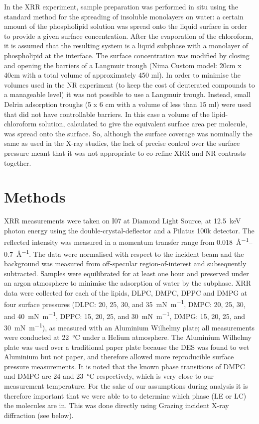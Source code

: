 \documentclass[11pt,a4paper]{paper}
\begin{document}
In the XRR experiment, sample preparation was performed in situ using the standard method for the spreading of insoluble monolayers on water: a certain amount of the phospholipid solution was spread onto the liquid surface in order to provide a given surface concentration. After the evaporation of the chloroform, it is assumed that the resulting system is a liquid subphase with a monolayer of phospholipid at the interface. The surface concentration was modified by closing and opening the barriers of a Langmuir trough (Nima Custom model: 20cm x 40cm with a total volume of approximately 450 ml). In order to minimise the volumes used in the NR experiment (to keep the cost of deuterated compounds to a manageable level) it was not possible to use a Langmuir trough. Instead, small Delrin adsorption troughs (5 x 6 cm with a volume of less than 15 ml) were used that did not have controllable barriers. In this case a volume of the lipid-chloroform solution, calculated to give the equivalent surface area per molecule, was spread onto the surface. So, although the surface coverage was nominally the same as used in the X-ray studies, the lack of precise control over the surface pressure meant that it was not appropriate to co-refine XRR and NR contrasts together.

\section{Methods}
XRR measurements were taken on I07 at Diamond Light Source, at \SI{12.5}{\kilo\eV} photon energy using the double-crystal-deflector\cite{Arnold2012} and a Pilatus 100k detector. The reflected intensity was measured in a momentum transfer range from \SIrange{0.018}{0.7}{\AA^{-1}}. The data were normalised with respect to the incident beam and the background was measured from off-specular region-of-interest and subsequently subtracted. Samples were equilibrated for at least one hour and preserved under an argon atmosphere to minimise the adsorption of water by the subphase. XRR data were collected for each of the lipids, DLPC, DMPC, DPPC and DMPG at four surface pressures (DLPC: 20, 25, 30, and \SI{35}{\milli\newton\meter^{-1}}, DMPC: 20, 25, 30, and \SI{40}{\milli\newton\meter^{-1}}, DPPC: 15, 20, 25, and \SI{30}{\milli\newton\meter^{-1}}, DMPG: 15, 20, 25, and \SI{30}{\milli\newton\meter^{-1}}), as measured with an Aluminium Wilhelmy plate; all measurements were conducted at \SI{22}{\celsius} under a Helium atmosphere. The Aluminium Wilhelmy plate was used over a traditional paper plate because the DES was found to wet Aluminium but not paper, and therefore allowed more reproducible surface pressure measurements.
It is noted that the known phase transitions of DMPC and DMPG are 24 and \SI{23}{\celsius} respectively, which is very close to our measurement temperature. For the sake of our assumptions during analysis it is therefore important that we were able to to determine which phase (LE or LC) the molecules are in. This was done directly using Grazing incident X-ray diffraction (see below).
\end{document}

